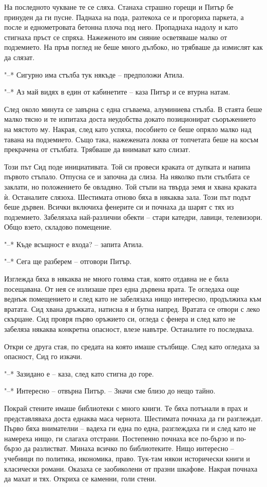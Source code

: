 \documentclass[ebook,openany,12pt]{memoir}
\begin{document}
На последното чукване те се сляха. Станаха страшно горещи и Питър бе принуден да ги пусне. Паднаха на пода, разтекоха се и прогориха паркета, а после и еднометровата бетонна плоча под него. Пропаднаха надолу и като стигнаха пръст се спряха. Нажеженото им сияние осветяваше малко от подземието. На пръв поглед не беше много дълбоко, но трябваше да измислят как да слязат.

"--* Сигурно има стълба тук някъде – предположи Атила.

"--* Аз май видях в един от кабинетите – каза Питър и се втурна натам. 

След около минута се завърна с една сгъваема, алуминиева стълба. В стаята беше малко тясно и те изпитаха доста неудобства докато позиционират съоръжението на мястото му. Накрая, след като успяха, пособието се беше опряло малко над тавана на подземието. Също така, нажежената локва от топчетата беше на косъм прекрачена от стълбата. Трябваше да внимават като слизат.

Този път Сид поде инициативата. Той си провеси краката от дупката и напипа първото стъпало. Отпусна се и започна да слиза. На няколко пъти стълбата се заклати, но положението бе овладяно. Той стъпи на твърда земя и хвана краката ѝ. Останалите слязоха. Шестимата отново бяха в някаква зала. Този път подът беше дървен. Всички включиха фенерите си и почнаха да шарят с тях из подземието. Забелязаха най-различни обекти – стари катедри, лавици, телевизори. Общо взето, складово помещение.

"--* Къде всъщност е входа? – запита Атила.

"--* Сега ще разберем – отговори Питър.

Изглежда бяха в някаква не много голяма стая, която отдавна не е била посещавана. От нея се излизаше през една дървена врата. Те огледаха още веднъж помещението и след като не забелязаха нищо интересно, продължиха към вратата. Сид хвана дръжката, натисна я и бутна напред. Вратата се отвори с леко скърцане. Сид провря първо оръжието си, огледа с фенера и след като не забеляза някаква конкретна опасност, влезе навътре. Останалите го последваха.

Откри се друга стая, по средата на която имаше стълбище. След като огледаха за опасност, Сид го изкачи.

"--* Зазидано е – каза, след като стигна до горе.

"--* Интересно – отвърна Питър. – Значи сме близо до нещо тайно.

Покрай стените имаше библиотеки с много книги. Те бяха потънали в прах и представляваха доста еднаква маса чернота. Шестимата почнаха да ги разглеждат. Първо бяха внимателни – вадеха ги една по една, разглеждаха ги и след като не намереха нищо, ги слагаха отстрани. Постепенно почнаха все по-бързо и по-бързо да разлистват. Минаха всичко по библиотеките. Нищо интересно – учебници по политика, икономика, право. Тук-там някои исторически книги и класически романи. Оказаха се заобиколени от празни шкафове. Накрая почнаха да махат и тях. Откриха се каменни, голи стени.
\end{document}
